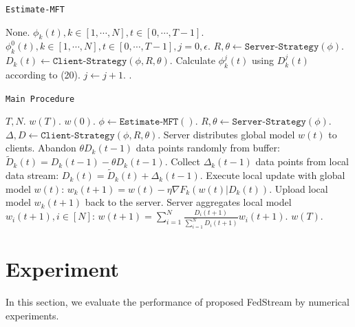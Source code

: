 \documentclass{article}
\theoremstyle{plain}
\theoremstyle{definition}
\theoremstyle{remark}
\begin{document}
\begin{algorithm}[tb]
    \caption{\texttt{Estimate-MFT}}
    \begin{algorithmic}[1]
         None.
         $\phi_k(t), k \in [1, \cdots, N], t \in [0, \cdots, T - 1]$.
         $\phi_k^0(t), k \in [1, \cdots, N], t \in [0, \cdots, T - 1], j=0, \epsilon$.
        \REPEAT
            \STATE $R, \theta \gets \texttt{Server-Strategy}(\phi)$.
            \STATE $D_k(t) \gets \texttt{Client-Strategy}(\phi, R, \theta)$.
                \STATE Calculate $\phi_k^j(t)$ using $D_k^j(t)$ according to (20).
            \ENDFOR
            \STATE $j \gets j + 1.$
        .
    \end{algorithmic}
 \end{algorithm}

 \begin{algorithm}
    \caption{\texttt{Main Procedure}}
    \begin{algorithmic}[1]
         $T, N$.
         $w(T)$.
         $w(0)$.
        \STATE $\phi \gets \texttt{Estimate-MFT}()$.
        \STATE $R, \theta \gets \texttt{Server-Strategy}(\phi)$.
        \STATE $\Delta, D \gets \texttt{Client-Strategy}(\phi, R, \theta)$.
            \STATE Server distributes global model $w(t)$ to clients.
                \STATE Abandon $\theta D_k(t-1)$ data points randomly from buffer: $\widetilde{D}_k(t) = D_k(t-1) - \theta D_k(t-1)$.
                \STATE Collect $\Delta_k(t-1)$ data points from local data stream: $D_k(t) = \widetilde{D}_k(t) + \Delta_k(t-1)$.
                \STATE Execute local update with global model $w(t)$: $w_k(t+1) = w(t) - \eta \nabla F_k(w(t)|D_k(t))$. 
                \STATE Upload local model $w_k(t+1)$ back to the server.
            \ENDFOR
            \STATE Server aggregates local model $w_i(t+1), i \in [N]$: $w(t+1) = \sum_{i=1}^{N} \frac{D_i(t+1)}{\sum_{i=1}^{N}D_i(t+1)} w_i(t+1)$.
        \ENDFOR
         $w(T)$.
    \end{algorithmic}
 \end{algorithm}

\section{Experiment}
In this section, we evaluate the performance of proposed FedStream by numerical experiments.
\end{document}
